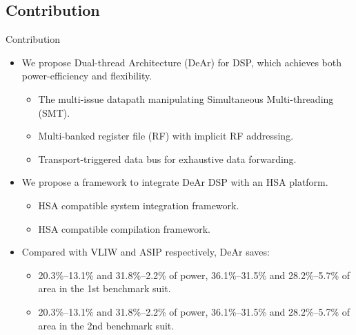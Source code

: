 \documentclass{beamer}
\begin{document}
\begin{CJK}{UTF8}{bkai}
    \subsection{Contribution}

    \begin{frame}{Contribution}
        \begin{itemize}
            \item {
                    We propose Dual-thread Architecture (DeAr) for DSP, which achieves both power-efficiency and flexibility.
                    \begin{itemize}
                        \item {
                                The multi-issue datapath manipulating Simultaneous Multi-threading (SMT).
                            }
                        \item {
                                Multi-banked register file (RF) with implicit RF addressing.
                            }
                        \item {
                                Transport-triggered data bus for exhaustive data forwarding.
                            }
                        \end{itemize}
                }
            \item {
                    We propose a framework to integrate DeAr DSP with an HSA platform.
                    \begin{itemize}
                        \item {
                                HSA compatible system integration framework.
                            }
                        \item {
                                HSA compatible compilation framework.
                            }
                        \end{itemize}
                }
            \item{
        Compared with VLIW and ASIP respectively, DeAr saves: 
                    \begin{itemize}
                        \item {
                            20.3\%--13.1\% and 31.8\%--2.2\% of power, 36.1\%--31.5\% and 28.2\%--5.7\% of area in the 1st benchmark suit.
                            }
                        \item {
                            20.3\%--13.1\% and 31.8\%--2.2\% of power, 36.1\%--31.5\% and 28.2\%--5.7\% of area in the 2nd benchmark suit.
                            }
                        \end{itemize}
                }
        \end{itemize}
    \end{frame}


\end{CJK}
\end{document}
